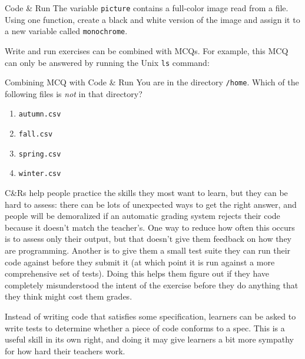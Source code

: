 \begin{aside}{Code \& Run}
  The variable \texttt{picture} contains a full-color image read from a file.
  Using one function,
  create a black and white version of the image
  and assign it to a new variable called \texttt{monochrome}.
\end{aside}

Write and run exercises can be combined with MCQs.
For example,
this MCQ can only be answered by running the Unix \texttt{ls} command:

\begin{aside}{Combining MCQ with Code \& Run}
  You are in the directory \texttt{/home}.
  Which of the following files is \emph{not} in that directory?

  \begin{enumerate}
  \item
    \texttt{autumn.csv}
  \item
    \texttt{fall.csv}
  \item
    \texttt{spring.csv}
  \item
    \texttt{winter.csv}
  \end{enumerate}
\end{aside}

C\&Rs help people practice the skills they most want to learn,
but they can be hard to assess:
there can be lots of unexpected ways to get the right answer,
and people will be demoralized if an automatic grading system rejects their code
because it doesn't match the teacher's.
One way to reduce how often this occurs is to assess only their output,
but that doesn't give them feedback on how they are programming.
Another is to give them a small test suite they can run their code against
before they submit it
(at which point it is run against a more comprehensive set of tests).
Doing this helps them figure out if they have completely misunderstood the intent of the exercise
before they do anything that they think might cost them grades.

Instead of writing code that satisfies some specification,
learners can be asked to write tests
to determine whether a piece of code conforms to a spec.
This is a useful skill in its own right,
and doing it may give learners a bit more sympathy for how hard their teachers work.

